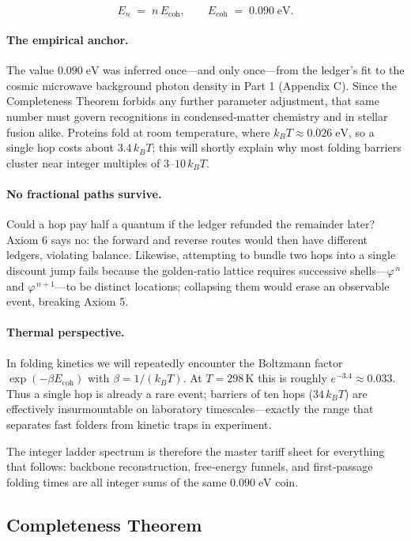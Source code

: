 \documentclass[11pt]{article}
\newcommand{\phiGR}{\varphi}                 %
\newcommand{\Eoh}{E_{\mathrm{coh}}}          %
\begin{document}
\[
E_{n} \;=\; n\,\Eoh,
\qquad
\Eoh \;=\; 0.090\;\text{eV}.
\]

\paragraph{The empirical anchor.}
The value \(0.090\;\text{eV}\) was inferred once—and only once—from the
ledger’s fit to the cosmic microwave background photon density in Part 1
(Appendix C).  Since the Completeness Theorem forbids any further
parameter adjustment, that same number must govern recognitions in
condensed‐matter chemistry and in stellar fusion alike.  Proteins fold
at room temperature, where \(k_{B}T \approx 0.026\;\text{eV}\), so a
single hop costs about \(3.4\,k_{B}T\); this will shortly explain why
most folding barriers cluster near integer multiples of \(3\text{–}10\,
k_{B}T\).

\paragraph{No fractional paths survive.}
Could a hop pay half a quantum if the ledger refunded the remainder
later?  Axiom 6 says no: the forward and reverse routes would then have
different ledgers, violating balance.  Likewise, attempting to bundle two
hops into a single discount jump fails because the golden‐ratio lattice
requires successive shells—\(\phiGR^{\,n}\) and \(\phiGR^{\,n+1}\)—to be
distinct locations; collapsing them would erase an observable event,
breaking Axiom 5.

\paragraph{Thermal perspective.}
In folding kinetics we will repeatedly encounter the Boltzmann factor
\(\exp(-\beta\Eoh)\) with \(\beta=1/(k_{B}T)\).  At \(T=298\,\text{K}\)
this is roughly \(e^{-3.4}\approx0.033\).  Thus a single hop is already a
rare event; barriers of ten hops (\(34\,k_{B}T\)) are effectively
insurmountable on laboratory timescales—exactly the range that separates
fast folders from kinetic traps in experiment.

The integer ladder spectrum is therefore the master tariff sheet for
everything that follows: backbone reconstruction, free‐energy funnels,
and first‐passage folding times are all integer sums of the same
\(0.090\;\text{eV}\) coin.

\subsection{Completeness Theorem}\label{sec:completeness}
\end{document}
